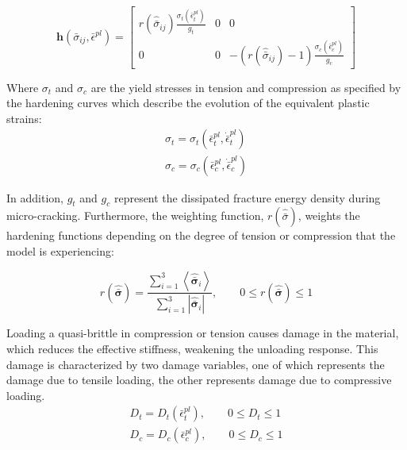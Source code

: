 \begin{equation}
\mathbf{h}\left(\bar{\sigma}_{ij},\bar{\epsilon}^{pl}\right)=\left[\begin{array}{ccc}
r\left(\hat{\bar{\sigma}}_{ij}\right)\frac{\sigma_t\left(\bar{\epsilon}_{t}^{pl}\right)}{g_t} & 0 & 0\\
0 & 0 & -\left(r\left(\hat{\bar{\sigma}}_{ij}\right)-1\right)\frac{\sigma_c\left(\bar{\epsilon}_{c}^{pl}\right)}{g_c}
\end{array}\right]\label{eqn:const9-1}
\end{equation}

Where $\sigma_t$ and $\sigma_c$ are the yield stresses in tension and compression as specified by the hardening curves which describe the evolution of the equivalent plastic strains: 
\begin{equation}
\begin{array}{c}
\sigma_{t}=\sigma_{t}\left(\bar{\epsilon}_{t}^{pl},\dot{\bar{\epsilon}}_{t}^{pl}\right)\\
\sigma_{c}=\sigma_{c}\left(\bar{\epsilon}_{c}^{pl},\dot{\bar{\epsilon}}_{c}^{pl}\right)
\end{array}
\label{eqn:dam1}
\end{equation}

In addition, $g_t$ and $g_c$ represent the dissipated fracture energy density during micro-cracking. Furthermore, the weighting function, $r\left(\hat{\bar{\sigma}}\right)$, weights the hardening functions depending on the degree of tension or compression that the model is experiencing:

\begin{equation}
r\left(\hat{\boldsymbol{\bar{\sigma}}}\right)=\frac{\sum_{i=1}^{3}\left\langle \hat{\boldsymbol{\bar{\sigma}}}_{i}\right\rangle }{\sum_{i=1}^{3}\left|\hat{\boldsymbol{\bar{\sigma}}}_{i}\right|},\qquad0\leq r\left(\hat{\boldsymbol{\bar{\sigma}}}\right)\leq1\label{eqn:const9-2}
\end{equation}


Loading a quasi-brittle in compression or tension causes damage in
the material, which reduces the effective stiffness, weakening the
unloading response. This damage is characterized by two damage variables,
one of which represents the damage due to tensile loading, the other
represents damage due to compressive loading. 
\begin{equation}
\begin{array}{c}
D_{t}=D_{t}\left(\bar{\epsilon}_{t}^{pl}\right),\qquad0\leq D_{t}\leq1\\
D_{c}=D_{c}\left(\bar{\epsilon}_{c}^{pl}\right),\qquad0\leq D_{c}\leq1\end{array}
\label{eqn:dam2}
\end{equation}


